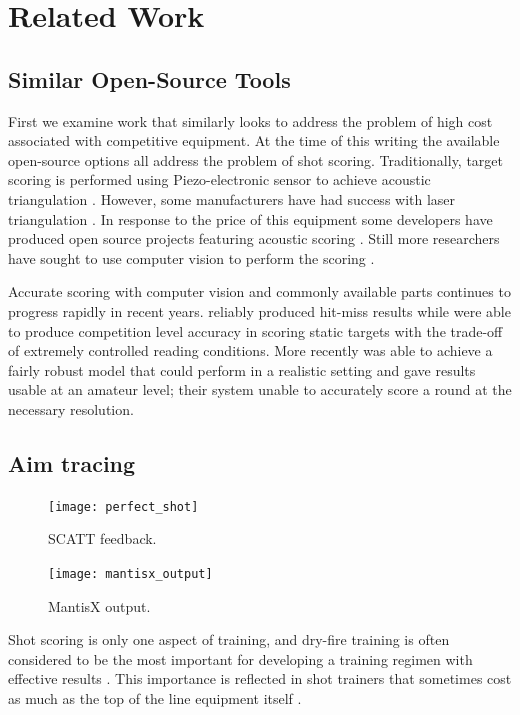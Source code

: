 \documentclass[conference]{IEEEtran}
\begin{document}
\section{Related Work}

\subsection{Similar Open-Source Tools}

First we examine work that similarly looks to address the problem of high cost associated with competitive equipment.
At the time of this writing the available open-source options all address the problem of shot scoring.
Traditionally, target scoring is performed using Piezo-electronic sensor to achieve acoustic triangulation \cite{Anderson2018}.
However, some manufacturers have had success with laser triangulation \cite{SUIS}.
In response to the price of this equipment some developers have produced open source projects featuring acoustic scoring \cite{etarg, freetarget}.
Still more researchers have sought to use computer vision to perform the scoring \cite{Rudzinski2012, Stenhager2021}.

Accurate scoring with computer vision and commonly available parts continues to progress rapidly in recent years.
\cite{Ye2011} reliably produced  hit-miss results while \cite{Rudzinski2012} were able to produce competition level accuracy in scoring static targets with the trade-off of extremely controlled reading conditions.
More recently \cite{Stenhager2021} was able to achieve a fairly robust model that could perform in a realistic setting and gave results usable at an amateur level; their system unable to accurately score a round at the necessary resolution.

\subsection{Aim tracing}

\begin{figure}[]
	\centering
	\texttt{[image: perfect\_shot]}
	\caption{SCATT \cite{scatt} feedback.}
	\label{fig:SCATT_Example}
\end{figure}

\begin{figure}[]
	\centering
	\texttt{[image: mantisx\_output]}
	\caption{MantisX \cite{mantisx} output.}
	\label{fig:MantisX_Example}
\end{figure}

Shot scoring is only one aspect of training, and dry-fire training is often 
considered to be the most important for developing a training regimen with effective results
\cite{Potter2017}.
This importance is reflected in shot trainers that sometimes cost as much as the top of the line equipment itself
\cite{scatt, noptel}.
\end{document}
